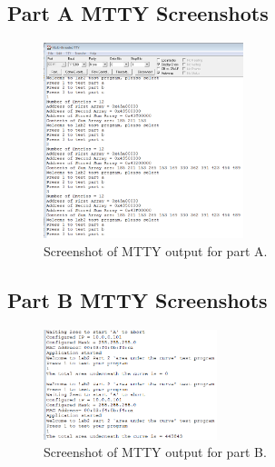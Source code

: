 \documentclass[10pt, letterpaper, titlepage]{article} %
\begin{document}
\subsection{Part A MTTY Screenshots}
\begin{figure}[H]
   \includegraphics[width=0.52\textwidth]{mttypartA.png}
   \centering  
   \caption{Screenshot of MTTY output for part A.} 
   \label{figure:4}
\end{figure}

\subsection{Part B MTTY Screenshots}
\begin{figure}[H]
   \includegraphics[width=0.45\textwidth]{mttypartB.png}
   \centering  
   \caption{Screenshot of MTTY output for part B.} 
   \label{figure:5}
\end{figure}
\end{document}
